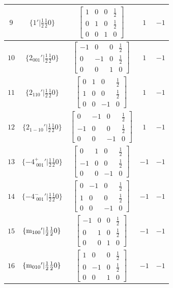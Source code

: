 \documentclass[fleqn,8pt]{jsarticle}
\begin{document}
\begin{longtable}{ccccc}
$ 9 $ & $ \{1{}'|\frac{1}{2} \frac{1}{2} 0\} $ & $ \begin{bmatrix} 1 & 0 & 0 & \frac{1}{2} \\ 0 & 1 & 0 & \frac{1}{2} \\ 0 & 0 & 1 & 0 \end{bmatrix} $ & $ 1 $ & $ -1 $ \\ \hline
$ 10 $ & $ \{2{}_{001}{}'|\frac{1}{2} \frac{1}{2} 0\} $ & $ \begin{bmatrix} -1 & 0 & 0 & \frac{1}{2} \\ 0 & -1 & 0 & \frac{1}{2} \\ 0 & 0 & 1 & 0 \end{bmatrix} $ & $ 1 $ & $ -1 $ \\ \hline
$ 11 $ & $ \{2{}_{110}{}'|\frac{1}{2} \frac{1}{2} 0\} $ & $ \begin{bmatrix} 0 & 1 & 0 & \frac{1}{2} \\ 1 & 0 & 0 & \frac{1}{2} \\ 0 & 0 & -1 & 0 \end{bmatrix} $ & $ 1 $ & $ -1 $ \\ \hline
$ 12 $ & $ \{2{}_{1-10}{}'|\frac{1}{2} \frac{1}{2} 0\} $ & $ \begin{bmatrix} 0 & -1 & 0 & \frac{1}{2} \\ -1 & 0 & 0 & \frac{1}{2} \\ 0 & 0 & -1 & 0 \end{bmatrix} $ & $ 1 $ & $ -1 $ \\ \hline
$ 13 $ & $ \{-4^{+}_{\,\,001}{}'|\frac{1}{2} \frac{1}{2} 0\} $ & $ \begin{bmatrix} 0 & 1 & 0 & \frac{1}{2} \\ -1 & 0 & 0 & \frac{1}{2} \\ 0 & 0 & -1 & 0 \end{bmatrix} $ & $ -1 $ & $ -1 $ \\ \hline
$ 14 $ & $ \{-4^{-}_{\,\,001}{}'|\frac{1}{2} \frac{1}{2} 0\} $ & $ \begin{bmatrix} 0 & -1 & 0 & \frac{1}{2} \\ 1 & 0 & 0 & \frac{1}{2} \\ 0 & 0 & -1 & 0 \end{bmatrix} $ & $ -1 $ & $ -1 $ \\ \hline
$ 15 $ & $ \{{\rm m}_{100}{}'|\frac{1}{2} \frac{1}{2} 0\} $ & $ \begin{bmatrix} -1 & 0 & 0 & \frac{1}{2} \\ 0 & 1 & 0 & \frac{1}{2} \\ 0 & 0 & 1 & 0 \end{bmatrix} $ & $ -1 $ & $ -1 $ \\ \hline
$ 16 $ & $ \{{\rm m}_{010}{}'|\frac{1}{2} \frac{1}{2} 0\} $ & $ \begin{bmatrix} 1 & 0 & 0 & \frac{1}{2} \\ 0 & -1 & 0 & \frac{1}{2} \\ 0 & 0 & 1 & 0 \end{bmatrix} $ & $ -1 $ & $ -1 $ \\
\end{longtable}
\end{document}
